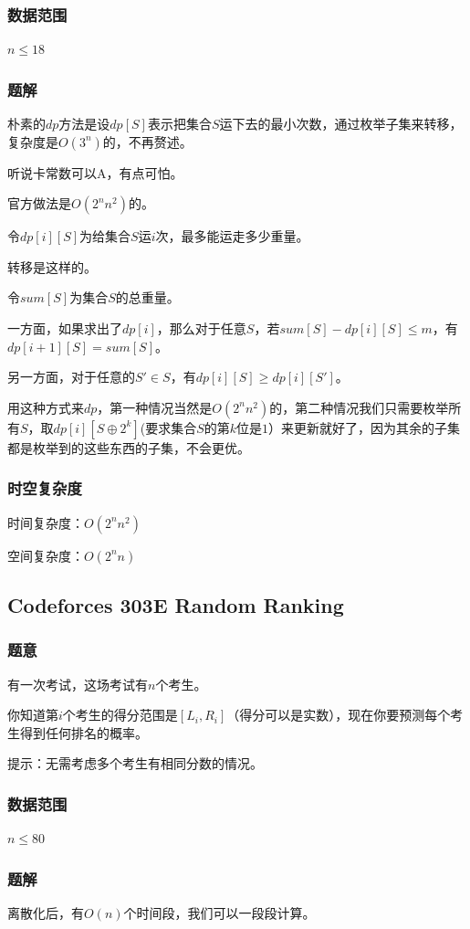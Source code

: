 \documentclass{ctexart}
\begin{document}
\subsubsection{数据范围}
$n \le 18$
\subsubsection{题解}
朴素的$dp$方法是设$dp[S]$表示把集合$S$运下去的最小次数，通过枚举子集来转移，复杂度是$O(3^n)$的，不再赘述。

听说卡常数可以A，有点可怕。

官方做法是$O(2^nn^2)$的。

令$dp[i][S]$为给集合$S$运$i$次，最多能运走多少重量。

转移是这样的。

令$sum[S]$为集合$S$的总重量。

一方面，如果求出了$dp[i]$，那么对于任意$S$，若$sum[S]-dp[i][S] \le m$，有$dp[i+1][S]=sum[S]$。

另一方面，对于任意的$S' \in S$，有$dp[i][S] \ge dp[i][S']$。

用这种方式来$dp$，第一种情况当然是$O(2^nn^2)$的，第二种情况我们只需要枚举所有$S$，取$dp[i][S \oplus 2^k]$(要求集合$S$的第$k$位是$1$）来更新就好了，因为其余的子集都是枚举到的这些东西的子集，不会更优。
\subsubsection{时空复杂度}
时间复杂度：$O(2^nn^2)$

空间复杂度：$O(2^nn)$
\subsection{Codeforces 303E Random Ranking}
\subsubsection{题意}
有一次考试，这场考试有$n$个考生。

你知道第$i$个考生的得分范围是$[L_i,R_i]$（得分可以是实数），现在你要预测每个考生得到任何排名的概率。

提示：无需考虑多个考生有相同分数的情况。
\subsubsection{数据范围}
$n \le 80$
\subsubsection{题解}
离散化后，有$O(n)$个时间段，我们可以一段段计算。
\end{document}
